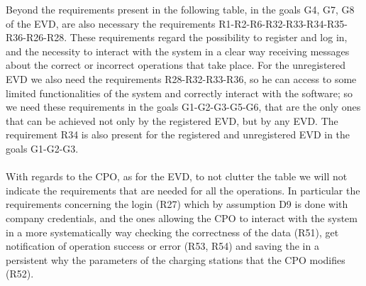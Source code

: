 Beyond the requirements present in the following table, in the goals G4, G7, G8 of the EVD, are also necessary the requirements R1-R2-R6-R32-R33-R34-R35-R36-R26-R28. These requirements regard the possibility to register and log in, and the necessity to interact with the system in a clear way receiving messages about the correct or incorrect operations that take place. For the unregistered EVD we also need the requirements R28-R32-R33-R36, so he can access to some limited functionalities of the system and correctly interact with the software; so we need these requirements in the goals G1-G2-G3-G5-G6, that are the only ones that can be achieved not only by the registered EVD, but by any EVD. The requirement R34 is also present for the registered and unregistered EVD in the goals G1-G2-G3. \\\\
With regards to the CPO, as for the EVD, to  not clutter the table we will not indicate the requirements that are needed for all the operations. In particular the requirements concerning the login (R27) which by assumption D9 is done with company credentials, and the ones allowing the CPO to interact with the system in a more systematically way checking the correctness of the data (R51), get notification of operation success or error (R53, R54) and saving the in a persistent why the parameters of the charging stations that the CPO modifies (R52).
